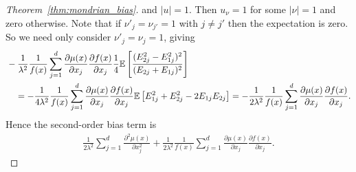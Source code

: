 \begin{proof}[Theorem~\ref{thm:mondrian_bias}]
  and $|u|=1$. Then $u_\nu = 1$ for some $|\nu| = 1$ and zero otherwise.
  Note that if $\nu'_j = \nu_{j'} = 1$ with $j \neq j'$ then the
  expectation is zero. So we need only consider $\nu'_j = \nu_j = 1$, giving
  \begin{align*}
    &- \frac{1}{\lambda^2}
    \frac{1}{f(x)}
    \sum_{j=1}^{d}
    \frac{\partial \mu(x)}{\partial x_j}
    \frac{\partial f(x)}{\partial x_j}
    \frac{1}{4}
    \mathbb{E} \left[
      \frac{(E_{2j}^2 - E_{1j}^2)^2}
      {(E_{2j} + E_{1j})^2}
    \right] \\
    &\quad=
    - \frac{1}{4 \lambda^2}
    \frac{1}{f(x)}
    \sum_{j=1}^{d}
    \frac{\partial \mu(x)}{\partial x_j}
    \frac{\partial f(x)}{\partial x_j}
    \mathbb{E} \left[
      E_{1j}^2
      + E_{2j}^2
      - 2 E_{1j} E_{2j}
    \right]
    =
    - \frac{1}{2 \lambda^2}
    \frac{1}{f(x)}
    \sum_{j=1}^{d}
    \frac{\partial \mu(x)}{\partial x_j}
    \frac{\partial f(x)}{\partial x_j}.
  \end{align*}
  Hence the second-order bias term is
  \begin{align*}
    \frac{1}{2 \lambda^2}
    \sum_{j=1}^d
    \frac{\partial^2 \mu(x)}{\partial x_j^2}
    + \frac{1}{2 \lambda^2}
    \frac{1}{f(x)}
    \sum_{j=1}^{d}
    \frac{\partial \mu(x)}{\partial x_j}
    \frac{\partial f(x)}{\partial x_j}.
  \end{align*}



\end{proof}
